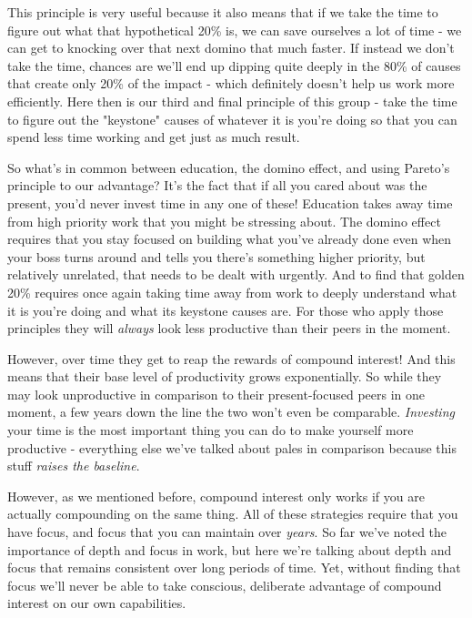 \documentclass[11pt,a5paper]{book}
\begin{document}
This principle is very useful because it also means that if we take the time to figure out what that hypothetical 20\% is, we can save ourselves a lot of time - we can get to knocking over that next domino that much faster. If instead we don't take the time, chances are we'll end up dipping quite deeply in the 80\% of causes that create only 20\% of the impact - which definitely doesn't help us work more efficiently. Here then is our third and final principle of this group - take the time to figure out the "keystone" causes of whatever it is you're doing so that you can spend less time working and get just as much result.
\newline

So what's in common between education, the domino effect, and using Pareto's principle to our advantage? It's the fact that if all you cared about was the present, you'd never invest time in any one of these! Education takes away time from high priority work that you might be stressing about. The domino effect requires that you stay focused on building what you've already done even when your boss turns around and tells you there's something higher priority, but relatively unrelated, that needs to be dealt with urgently. And to find that golden 20\% requires once again taking time away from work to deeply understand what it is you're doing and what its keystone causes are. For those who apply those principles they will \textit{always} look less productive than their peers in the moment. 
\newline

However, over time they get to reap the rewards of compound interest! And this means that their base level of productivity grows exponentially. So while they may look unproductive in comparison to their present-focused peers in one moment, a few years down the line the two won't even be comparable. \textit{Investing} your time is the most important thing you can do to make yourself more productive - everything else we've talked about pales in comparison because this stuff \textit{raises the baseline}. 
\newline

However, as we mentioned before, compound interest only works if you are actually compounding on the same thing. All of these strategies require that you have focus, and focus that you can maintain over \textit{years}. So far we've noted the importance of depth and focus in work, but here we're talking about depth and focus that remains consistent over long periods of time. Yet, without finding that focus we'll never be able to take conscious, deliberate advantage of compound interest on our own capabilities.
\end{document}
